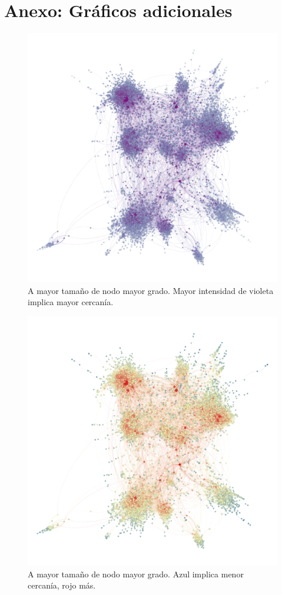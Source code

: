 \section{Anexo: Gráficos adicionales}

\begin{figure}[ht]
    \centerfloat
    \includegraphics[width=1.095\textwidth]{img/resultados/grado-cercania.png}
    \caption{A mayor tamaño de nodo mayor grado. Mayor intensidad de violeta implica mayor cercanía.}
\end{figure}

\begin{figure}[ht]
    \centerfloat
    \includegraphics[width=1.3\textwidth]{img/resultados/grado-cercania2.png}
    \caption{A mayor tamaño de nodo mayor grado. Azul implica menor cercanía, rojo más.}
\end{figure}


